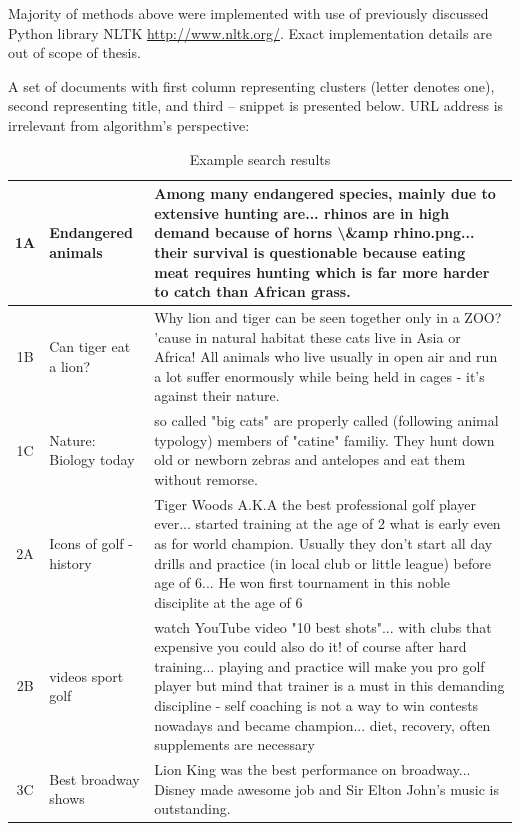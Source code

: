 \documentclass[a4paper, 12pt, oneside]{Thesis} %
\begin{document}
Majority of methods above were implemented with use of previously discussed Python library NLTK \url{http://www.nltk.org/}. Exact implementation details are out of scope of thesis.

A set of documents with first column representing clusters (letter denotes one), second representing title, and third -- snippet is presented below. URL address is irrelevant from algorithm's perspective:

\begin{table}[th]
\centering
 \begin{tabular}{| c | p{3cm} | p{10cm} |}
 \hline
 1A &  Endangered animals &  Among many endangered species, mainly due to extensive hunting are... rhinos are in high demand because of horns \textbackslash\&amp rhino.png... their survival is questionable because eating meat requires hunting which is far more harder to catch than African grass.  \\ \hline
 1B &  Can tiger eat a lion? &  Why lion and tiger can be seen together only in a ZOO? 'cause in natural habitat these cats live in Asia or Africa! All animals who live usually in open air and run a lot suffer enormously while being held in cages - it's against their nature. \\ \hline
 1C &  Nature: Biology today &  so called "big cats" are properly called (following animal typology) members of "catine" familiy. They hunt down old or newborn zebras and antelopes and eat them without remorse. \\ \hline
 2A &  Icons of golf - history &  Tiger Woods A.K.A the best professional golf player ever... started training at the age of 2 what is early even as for world champion. Usually they don't start all day drills and practice (in local club or little league) before age of 6... He won first tournament in this noble disciplite at the age of 6 \\ \hline
 2B &  videos sport golf &  watch YouTube video "10 best shots"... with clubs that expensive you could also do it! of course after hard training... playing and practice will make you pro golf player but mind that trainer is a must in this demanding discipline - self coaching is not a way to win contests nowadays and became champion... diet, recovery, often supplements are necessary \\ \hline
 3C &  Best broadway shows &  Lion King was the best performance on broadway...  Disney made awesome job and Sir Elton John's music is outstanding. \\ \hline
\end{tabular}
\caption{Example search results}
\label{tab:searchresults}
\end{table}
\end{document}

